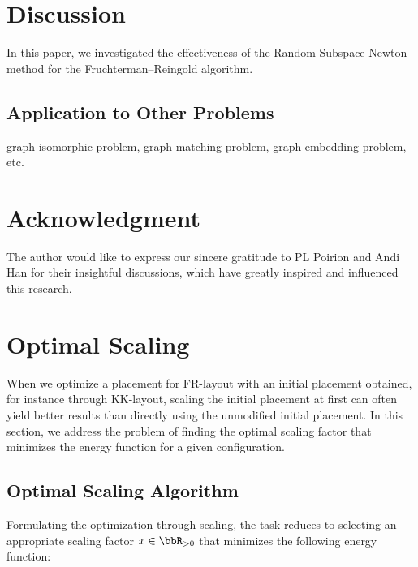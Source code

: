 \documentclass[dvipdfmx,lettersize,journal]{IEEEtran}
\begin{document}
\section{Discussion} \label{sec:discussion}

In this paper, we investigated the effectiveness of the Random Subspace Newton method for the Fruchterman--Reingold algorithm.

\subsection{Application to Other Problems}\label{ssec:application}

graph isomorphic problem, graph matching problem, graph embedding problem, etc.

\section{Acknowledgment}

The author would like to express our sincere gratitude to PL Poirion and Andi Han for their insightful discussions, which have greatly inspired and influenced this research.


\appendices

\section{Optimal Scaling}\label{sec:scaling}

When we optimize a placement for FR-layout with an initial placement obtained, for instance through KK-layout, scaling the initial placement at first can often yield better results than directly using the unmodified initial placement.
In this section, we address the problem of finding the optimal scaling factor that minimizes the energy function for a given configuration.

\subsection{Optimal Scaling Algorithm}\label{ssec:scalingAlgorithm}

Formulating the optimization through scaling, the task reduces to selecting an appropriate scaling factor $x \in \bbR_{> 0}$ that minimizes the following energy function:
\end{document}
